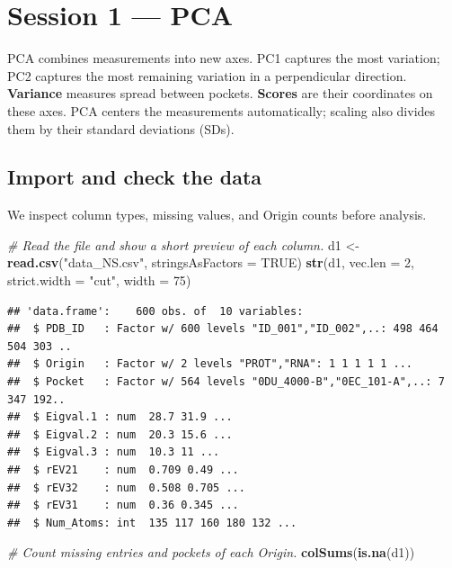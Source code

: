 \documentclass[
  10pt,
]{article}
\newenvironment{Shaded}{\begin{snugshade}}{\end{snugshade}}
\newcommand{\AttributeTok}[1]{\textcolor[rgb]{0.13,0.29,0.53}{#1}}
\newcommand{\CommentTok}[1]{\textcolor[rgb]{0.56,0.35,0.01}{\textit{#1}}}
\newcommand{\ConstantTok}[1]{\textcolor[rgb]{0.56,0.35,0.01}{#1}}
\newcommand{\DecValTok}[1]{\textcolor[rgb]{0.00,0.00,0.81}{#1}}
\newcommand{\FunctionTok}[1]{\textcolor[rgb]{0.13,0.29,0.53}{\textbf{#1}}}
\newcommand{\NormalTok}[1]{#1}
\newcommand{\OtherTok}[1]{\textcolor[rgb]{0.56,0.35,0.01}{#1}}
\newcommand{\StringTok}[1]{\textcolor[rgb]{0.31,0.60,0.02}{#1}}
\begin{document}
\section{Session 1 --- PCA}\label{session-1-pca}

PCA combines measurements into new axes. PC1 captures the most
variation; PC2 captures the most remaining variation in a perpendicular
direction. \textbf{Variance} measures spread between pockets.
\textbf{Scores} are their coordinates on these axes. PCA centers the
measurements automatically; scaling also divides them by their standard
deviations (SDs).

\subsection{Import and check the data}\label{import-and-check-the-data}

We inspect column types, missing values, and Origin counts before
analysis.

\begin{Shaded}
\begin{Highlighting}[]
\CommentTok{\# Read the file and show a short preview of each column.}
\NormalTok{d1 }\OtherTok{\textless{}{-}} \FunctionTok{read.csv}\NormalTok{(}\StringTok{"data\_NS.csv"}\NormalTok{, }\AttributeTok{stringsAsFactors =} \ConstantTok{TRUE}\NormalTok{)}
\FunctionTok{str}\NormalTok{(d1, }\AttributeTok{vec.len =} \DecValTok{2}\NormalTok{, }\AttributeTok{strict.width =} \StringTok{"cut"}\NormalTok{, }\AttributeTok{width =} \DecValTok{75}\NormalTok{)}
\end{Highlighting}
\end{Shaded}

\begin{verbatim}
## 'data.frame':    600 obs. of  10 variables:
##  $ PDB_ID   : Factor w/ 600 levels "ID_001","ID_002",..: 498 464 504 303 ..
##  $ Origin   : Factor w/ 2 levels "PROT","RNA": 1 1 1 1 1 ...
##  $ Pocket   : Factor w/ 564 levels "0DU_4000-B","0EC_101-A",..: 7 347 192..
##  $ Eigval.1 : num  28.7 31.9 ...
##  $ Eigval.2 : num  20.3 15.6 ...
##  $ Eigval.3 : num  10.3 11 ...
##  $ rEV21    : num  0.709 0.49 ...
##  $ rEV32    : num  0.508 0.705 ...
##  $ rEV31    : num  0.36 0.345 ...
##  $ Num_Atoms: int  135 117 160 180 132 ...
\end{verbatim}

\begin{Shaded}
\begin{Highlighting}[]
\CommentTok{\# Count missing entries and pockets of each Origin.}
\FunctionTok{colSums}\NormalTok{(}\FunctionTok{is.na}\NormalTok{(d1))}
\end{Highlighting}
\end{Shaded}
\end{document}
